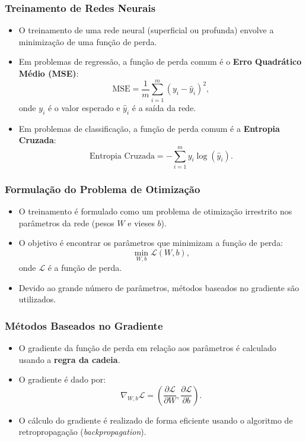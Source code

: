 \documentclass{beamer}
\begin{document}
\begin{frame}
\frametitle{Treinamento de Redes Neurais}
\begin{itemize}
    \item O treinamento de uma rede neural (superficial ou profunda) envolve a minimização de uma função de perda.
    \item Em problemas de regressão, a função de perda comum é o \textbf{Erro Quadrático Médio (MSE)}:
    \[
    \text{MSE} = \frac{1}{m} \sum_{i=1}^m (y_i - \hat{y}_i)^2,
    \]
    onde \( y_i \) é o valor esperado e \( \hat{y}_i \) é a saída da rede.
    \item Em problemas de classificação, a função de perda comum é a \textbf{Entropia Cruzada}:
    \[
    \text{Entropia Cruzada} = -\sum_{i=1}^m y_i \log(\hat{y}_i).
    \]
\end{itemize}
\end{frame}

\begin{frame}
\frametitle{Formulação do Problema de Otimização}
\begin{itemize}
    \item O treinamento é formulado como um problema de otimização irrestrito nos parâmetros da rede (pesos \( W \) e vieses \( b \)).
    \item O objetivo é encontrar os parâmetros que minimizam a função de perda:
    \[
    \min_{W, b} \mathcal{L}(W, b),
    \]
    onde \( \mathcal{L} \) é a função de perda.
    \item Devido ao grande número de parâmetros, métodos baseados no gradiente são utilizados.
\end{itemize}
\end{frame}

\begin{frame}
\frametitle{Métodos Baseados no Gradiente}
\begin{itemize}
    \item O gradiente da função de perda em relação aos parâmetros é calculado usando a \textbf{regra da cadeia}.
    \item O gradiente é dado por:
    \[
    \nabla_{W, b} \mathcal{L} = \left( \frac{\partial \mathcal{L}}{\partial W}, \frac{\partial \mathcal{L}}{\partial b} \right).
    \]
    \item O cálculo do gradiente é realizado de forma eficiente usando o algoritmo de retropropagação (\textit{backpropagation}).
\end{itemize}
\end{frame}
\end{document}

